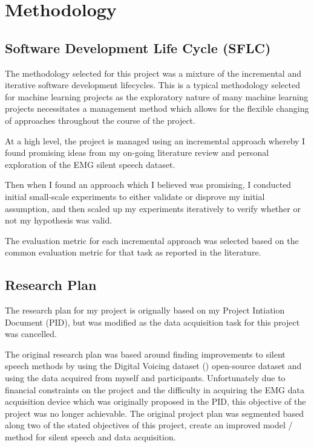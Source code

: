 \chapter{Methodology} \label{chap:Methodology}

\section{Software Development Life Cycle (SFLC)}

The methodology selected for this project was a mixture of the
incremental and iterative software development lifecycles. This
is a typical methodology selected for machine learning projects
as the exploratory nature of many machine learning projects
necessitates a management method which allows for the flexible
changing of approaches throughout the course of the project.

At a high level, the project is managed using an incremental
approach whereby I found promising ideas from my on-going
literature review and personal exploration of the EMG silent
speech dataset.

Then when I found an approach which I believed was promising,
I conducted initial small-scale experiments to either validate
or disprove my initial assumption, and then scaled up my experiments
iteratively to verify whether or not my hypothesis was valid.

The evaluation metric for each incremental approach was selected
based on the common evaluation metric for that task as reported
in the literature.

\section{Research Plan}

The research plan for my project is orignally based on my
Project Intiation Document (PID), but was modified as the 
data acquisition task for this project was cancelled.

The original research plan was based around finding improvements
to silent speech methods by using the Digital Voicing dataset
(\cite{gaddy2020digital}) open-source dataset and using the
data acquired from myself and participants. Unfortunately due
to financial constraints on the project and the difficulty in
acquiring the EMG data acquisition device which was originally
proposed in the PID, this objective of the project was no
longer achievable. The original project plan was segmented
based along two of the stated objectives of this project,
create an improved model / method for silent speech and data
acquisition.


